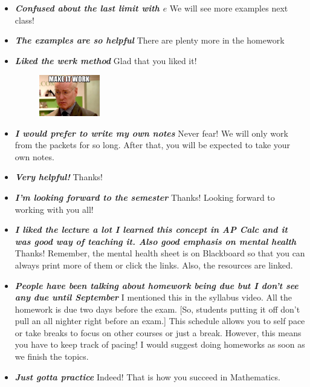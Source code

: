 \documentclass[11pt,letterpaper]{article}
\begin{document}
\begin{itemize}
\item {\bfseries\itshape Confused about the last limit with $e$} We will see more examples next class!

\item {\bfseries\itshape The examples are so helpful} There are plenty more in the homework \Winkey

\item {\bfseries\itshape Liked the werk method} Glad that you liked it!
	\begin{figure}[H]
	\centering
	\includegraphics[width=0.25\textwidth]{images/werk.jpeg}
	\end{figure}

\item {\bfseries\itshape I would prefer to write my own notes} Never fear! We will only work from the packets for so long. After that, you will be expected to take your own notes.

\item {\bfseries\itshape Very helpful!} Thanks!

\item {\bfseries\itshape I'm looking forward to the semester} Thanks! Looking forward to working with you all!

\item {\bfseries\itshape I liked the lecture a lot I learned this concept in AP Calc and it was good way of teaching it. Also good emphasis on mental health} Thanks! Remember, the mental health sheet is on Blackboard so that you can always print more of them or click the links. Also, the resources are linked. 

\item {\bfseries\itshape People have been talking about homework being due but I don't see any due until September} I mentioned this in the syllabus video. All the homework is due two days before the exam. [So, students putting it off don't pull an all nighter right before an exam.] This schedule allows you to self pace or take breaks to focus on other courses or just a break. However, this means you have to keep track of pacing! I would suggest doing homeworks as soon as we finish the topics. 

\item {\bfseries\itshape Just gotta practice} Indeed! That is how you succeed in Mathematics. 


\end{itemize}
\end{document}
